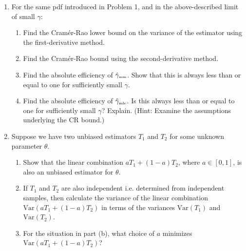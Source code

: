 \documentclass [12pt] {article}
\begin{document}
\begin{enumerate}
\item For the same pdf introduced in Problem 1, and in the above-described limit of small $\gamma$:
	\begin{enumerate}
	\item Find the Cram\'{e}r-Rao lower bound on the variance of the estimator using the first-derivative method.
	\item Find the Cram\'{e}r-Rao bound using the second-derivative method.
	\item Find the absolute efficiency of $\hat{\gamma}_{\mbox{\tiny mm}}$.  Show that this is always less than or equal to one for sufficiently small $\gamma$.
	\item Find the absolute efficiency of $\hat{\gamma}_{\mbox{\tiny mle}}$.  Is this always less than or equal to one for sufficiently small $\gamma$?  Explain.  (Hint:  Examine the assumptions underlying the CR bound.)
	\end{enumerate}

\item Suppose we have two unbiased estimators $T_1$ and $T_2$ for some unknown parameter $\theta$.
    \begin{enumerate}
        \item Show that the linear combination $aT_1+(1-a)T_2$, where $a \in [0,1]$, is also an unbiased estimator for $\theta$.
        \item If $T_1$ and $T_2$ are also independent i.e. determined from independent samples, then calculate the variance of the linear combination $\text{Var}(aT_1+(1-a)T_2)$ in terms of the variances $\text{Var}(T_1)$ and $\text{Var}(T_2)$.
        \item For the situation in part (b), what choice of $a$ minimizes $\text{Var}(aT_1+(1-a)T_2)$?
    \end{enumerate}

\end{enumerate}
\end{document}
